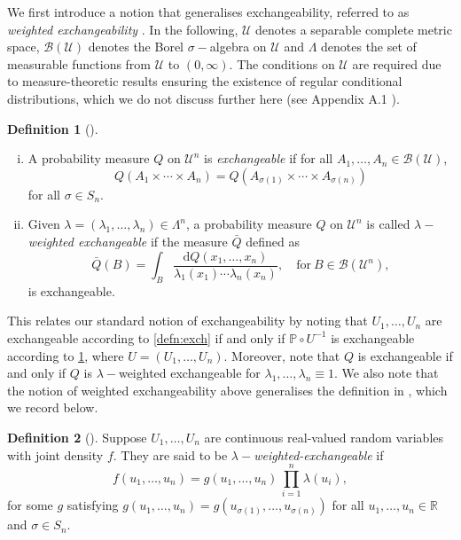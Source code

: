 \documentclass[11pt, titlepage]{article} %
\newcommand{\R}{\mathrm}
\numberwithin{equation}{section}
\theoremstyle{definition}
\newtheorem{definition}{Definition}
\numberwithin{theorem}{section}
\numberwithin{lemma}{section}
\numberwithin{corollary}{section}
\numberwithin{proposition}{section}
\numberwithin{definition}{section}
\numberwithin{remark}{section}
\begin{document}
\noindent
We first introduce a notion that generalises exchangeability, referred to as \textit{weighted exchangeability} \cite{tibshirani2019covariateshift,barber2024finetti,tang2023finiteweighted}. In the following, \(\mathcal{U}\) denotes a separable complete metric space, \(\mathcal{B}(\mathcal{U})\) denotes the Borel \(\sigma-\)algebra on \(\mathcal{U}\) and \(\Lambda\) denotes the set of measurable functions from \(\mathcal{U}\) to \((0, \infty)\).  The conditions on \(\mathcal{U}\) are required due to measure-theoretic results ensuring the existence of regular conditional distributions, which we do not discuss further here (see Appendix A.1 \cite{barber2024finetti}). 

\begin{definition}[\cite{barber2024finetti,tang2023finiteweighted}]
    \begin{enumerate}[(i)] \itemsep0em
        \item A probability measure \(Q\) on \(\mathcal{U}^n\) is \textit{exchangeable} if for all \(A_1, \ldots, A_n \in \mathcal{B}(\mathcal{U})\), \[Q(A_1 \times \cdots \times A_n) = Q(A_{\sigma(1)} \times \cdots \times A_{\sigma(n)})\] for all \(\sigma \in S_n.\) 
        \item Given \(\lambda = (\lambda_1, \ldots, \lambda_n) \in \Lambda^n\), a probability measure \(Q\) on \(\mathcal{U}^n\) is called \(\lambda-\)\textit{weighted exchangeable} if the measure \(\bar{Q}\) defined as \[\bar{Q}(B) = \int_{B} \frac{\R{d}Q(x_1, \ldots, x_n)}{\lambda_1(x_1) \cdots \lambda_n(x_n)}, \quad \mathrm{for} \ B \in \mathcal{B}(\mathcal{U}^n), \] is exchangeable.
    \end{enumerate}
\label{defn:weighted_exch}
\end{definition}

\noindent
This relates our standard notion of exchangeability by noting that \(U_1, \ldots, U_n\) are exchangeable according to \cref{defn:exch} if and only if \(\mathbb{P} \circ U^{-1}\) is exchangeable according to \cref{defn:weighted_exch}, where \(U = (U_1, \ldots, U_n)\). Moreover, note that \(Q\) is exchangeable if and only if \(Q\) is \(\lambda-\)weighted exchangeable for \(\lambda_1, \ldots, \lambda_n \equiv 1\). We also note that the notion of weighted exchangeability above generalises the definition in \cite{tibshirani2019covariateshift}, which we record below.

\begin{definition}[\cite{tibshirani2019covariateshift}]
    Suppose \(U_1, \ldots, U_n\) are continuous real-valued random variables with joint density \(f\). They are said to be \(\lambda-\)\textit{weighted-exchangeable} if \[f(u_1, \ldots, u_n) = g(u_1, \ldots, u_n) \, \prod_{i=1}^n \lambda(u_i),\] for some \(g\) satisfying \(g(u_1, \ldots, u_n) = g(u_{\sigma(1)}, \ldots, u_{\sigma(n)})\) for all \(u_1, \ldots, u_n \in \mathbb{R}\) and \(\sigma \in S_{n}\).
\label{defn:tibs_weighted_exch}
\end{definition}
\end{document}
